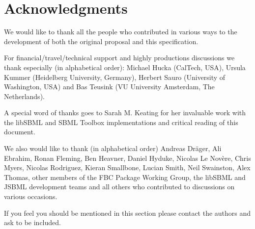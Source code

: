 
\section{Acknowledgments}

We would like to thank all the people who contributed in various ways to the development of both the original proposal and this specification.

For financial/travel/technical support and highly productions discussions we thank especially (in alphabetical order): Michael Hucka (CalTech, USA), Ursula Kummer (Heidelberg University, Germany), Herbert Sauro (University of Washington, USA) and Bas Teusink (VU University Amsterdam, The Netherlands).

A special word of thanks goes to Sarah M. Keating for her invaluable work with the \textsf{libSBML} and \textsf{SBML Toolbox} implementations and critical reading of this document.

We also would like to thank (in alphabetical order) Andreas Dr\"{a}ger, Ali Ebrahim, Ronan Fleming, Ben Heavner, Daniel Hyduke, Nicolas Le Nov\`{e}re, Chris Myers, Nicolas Rodriguez, Kieran Smallbone, Lucian Smith, Neil Swainston, Alex Thomas, other members of the \textsf{FBC Package Working Group}, the libSBML and JSBML development teams and all others who contributed to discussions on various occasions.

If you feel you should be mentioned in this section please contact the authors and ask to be included.

